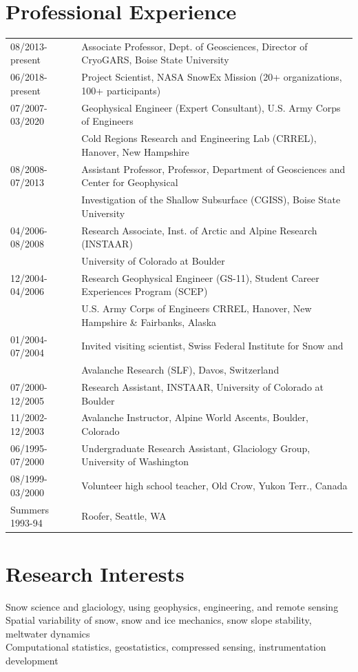 \documentclass[11pt]{article}
\begin{document}
\section*{Professional Experience}
\begin{tabular}{ll}
08/2013-present & Associate Professor, Dept. of Geosciences, Director of CryoGARS, Boise State University \\
06/2018-present & Project Scientist, NASA SnowEx Mission (20+ organizations, 100+ participants) \\
07/2007-03/2020 & Geophysical Engineer (Expert Consultant), U.S. Army Corps of Engineers \\
& Cold Regions Research and Engineering Lab (CRREL), Hanover, New Hampshire \\
08/2008-07/2013 & Assistant Professor, Professor, Department of Geosciences and Center for Geophysical \\
&   Investigation of the Shallow Subsurface (CGISS), Boise State University \\
04/2006-08/2008 & Research Associate, Inst. of Arctic and Alpine Research (INSTAAR) \\
& University of Colorado at Boulder \\ 
12/2004-04/2006 & Research Geophysical Engineer (GS-11), Student Career Experiences Program (SCEP) \\
& U.S. Army Corps of Engineers CRREL, Hanover, New Hampshire \& Fairbanks, Alaska \\
01/2004-07/2004 & Invited visiting scientist, Swiss Federal Institute for Snow and \\ 
& Avalanche Research (SLF), Davos, Switzerland \\ 
07/2000-12/2005 & Research Assistant, INSTAAR, University of Colorado at Boulder \\
11/2002-12/2003 & Avalanche Instructor, Alpine World Ascents, Boulder, Colorado \\
06/1995-07/2000 & Undergraduate Research Assistant, Glaciology Group, University of Washington \\
08/1999-03/2000 & Volunteer high school teacher, Old Crow, Yukon Terr., Canada \\
Summers 1993-94 & Roofer, Seattle, WA \\
\end{tabular}

\section*{Research Interests}
Snow science and glaciology, using geophysics, engineering, and remote sensing \\
Spatial variability of snow, snow and ice mechanics, snow slope stability, meltwater dynamics \\
Computational statistics, geostatistics, compressed sensing, instrumentation development \\
\end{document}
